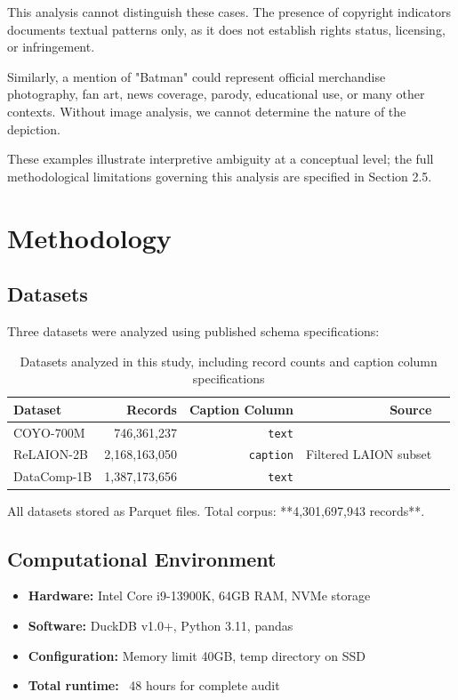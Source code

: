 \documentclass[11pt]{article}
\begin{document}
This analysis cannot distinguish these cases. The presence of copyright indicators documents textual patterns only, as it does not establish rights status, licensing, or infringement.

Similarly, a mention of "Batman" could represent official merchandise photography, fan art, news coverage, parody, educational use, or many other contexts. Without image analysis, we cannot determine the nature of the depiction.

These examples illustrate interpretive ambiguity at a conceptual level; the full methodological limitations governing this analysis are specified in Section 2.5.

\section{Methodology}

\subsection{Datasets}
Three datasets were analyzed using published schema specifications:

\begin{table}[htbp]
\centering
\caption{Datasets analyzed in this study, including record counts and caption column specifications}
\label{tab:datasets}
\begin{tabular}{lrrr l}
\toprule
Dataset & Records & Caption Column & Source \\
\midrule
COYO-700M     & 746,361,237          & \texttt{text}     & \citet{kakaobrain2022coyo} \\
ReLAION-2B    & 2,168,163,050        & \texttt{caption}  & Filtered LAION subset \\
DataComp-1B   & 1,387,173,656        & \texttt{text}     & \citet{gadre2023datacomp} \\
\bottomrule
\end{tabular}
\end{table}

All datasets stored as Parquet files. Total corpus: **4,301,697,943 records**.

\subsection{Computational Environment}

\begin{itemize}

\item \textbf{Hardware:} Intel Core i9-13900K, 64GB RAM, NVMe storage
\item \textbf{Software:} DuckDB v1.0+, Python 3.11, pandas
\item \textbf{Configuration:} Memory limit 40GB, temp directory on SSD
\item \textbf{Total runtime:} ~48 hours for complete audit

\end{itemize}
\end{document}
